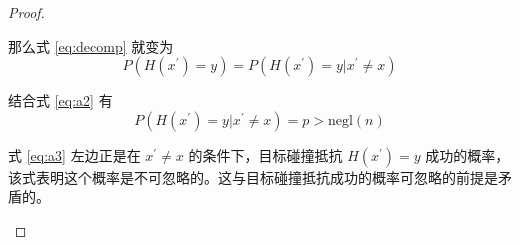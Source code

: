 \documentclass{sjtuarticle}
\begin{document}
\begin{enumerate}
\begin{proof}
\begin{enumerate}
            那么式 \eqref{eq:decomp} 就变为
            \begin{equation}
                P(H(x^\prime)=y)=P(H(x^\prime)=y|x^\prime\neq x)
            \end{equation}

            结合式 \eqref{eq:a2} 有
            \begin{equation}\label{eq:a3}
                P(H(x^\prime)=y|x^\prime\neq x)=p>\text{negl}(n)
            \end{equation}

            式 \eqref{eq:a3} 左边正是在 $x^\prime\neq x$ 的条件下，目标碰撞抵抗 $H(x^\prime)=y$ 成功的概率，该式表明这个概率是不可忽略的。这与目标碰撞抵抗成功的概率可忽略的前提是矛盾的。
        \end{enumerate}
    \end{proof}
\end{enumerate}
\end{document}
